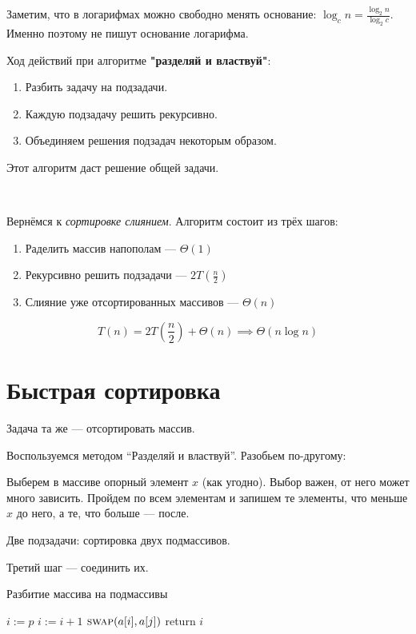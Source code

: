 \documentclass[12pt, a4paper]{article}
\begin{document}
Заметим, что в логарифмах можно свободно менять основание: $\log_c n = \frac {\log_2 n}{\log_2 c}$. Именно поэтому не пишут основание логарифма.

Ход действий при алгоритме \textbf{"разделяй и властвуй"}:
\begin{enumerate}
	\item Разбить задачу на подзадачи.
	\item Каждую подзадачу решить рекурсивно.
	\item Объединяем решения подзадач некоторым  образом.
\end{enumerate}
Этот алгоритм даст решение общей задачи.

\

Вернёмся к \emph{сортировке слиянием}. Алгоритм состоит из трёх шагов:
\begin{enumerate}
    \item Раделить массив напополам --- $\Theta(1)$
    \item Рекурсивно решить подзадачи --- $2 T(\frac{n}{2})$
    \item Слияние уже отсортированных массивов --- $\Theta(n)$
\end{enumerate}

\[T(n) = 2T\left(\frac n2\right) + \Theta(n) \implies \Theta(n\log n)\]

\section*{Быстрая сортировка}

Задача та же --- отсортировать массив.

Воспользуемся методом ``Разделяй и властвуй''. Разобьем по-другому:

Выберем в массиве опорный элемент $x$ (как угодно). Выбор важен, от него может много зависить. Пройдем по всем элементам и запишем те элементы, что меньше $x$ до него, а те, что больше --- после.

Две подзадачи: сортировка двух подмассивов.

Третий шаг --- соединить их.

\begin{algorithm}
\caption{Разбитие массива на подмассивы}
\begin{algorithmic}[1]
	\State $i \mathrel{:=} p$
			\State $i \mathrel{:=} i + 1$
			\State $\textsc{swap}(a[i], a[j])$
		\EndIf
	\EndFor
	\State return $i$
\EndFunction
\end{algorithmic}
\end{algorithm}
\end{document}
